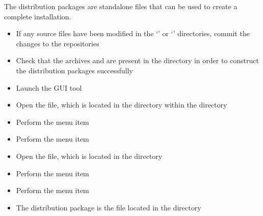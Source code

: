 \tertiaryEnd
\secondaryEnd
{}
The distribution packages are standalone files that can be used to create a complete
\mplusm{} installation.
\begin{itemize}
\item If any source files have been modified in the `' or
`' directories, commit the changes to the
 repositories
\item\exSp{}Check that the archives  and  are
present in the  directory in order to construct the distribution
packages successfully
\item\exSp{}Launch the  GUI tool
\item\exSp{}Open the  file, which is located in the
 directory within the 
directory
\item\exSp{}Perform the menu item 
\item\exSp{}Perform the menu item 
\item\exSp{}Open the  file, which is located in the
 directory
\item\exSp{}Perform the menu item 
\item\exSp{}Perform the menu item 
\item\exSp{}The distribution package is the  file located in the
 directory
\end{itemize}
\tertiaryEnd
{}
